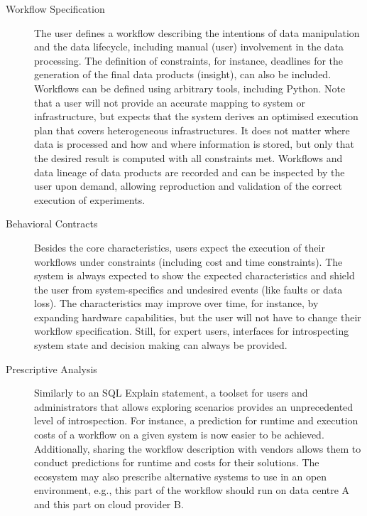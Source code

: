 \documentclass[a4paper]{article}
\begin{document}
{{\begin{description}
\item[Workflow Specification]

The user defines a workflow describing the intentions of data manipulation and the data lifecycle, including manual (user) involvement in the data processing.
The definition of constraints, for instance, deadlines for the generation of the final data products (insight), can also be included.
Workflows can be defined using arbitrary tools, including Python.
Note that a user will not provide an accurate mapping to system or infrastructure, but expects that the system derives an optimised execution plan that covers heterogeneous infrastructures.
It does not matter where data is processed and how and where information is stored, but only that the desired result is computed with all constraints met.
Workflows and data lineage of data products are recorded and can be inspected by the user upon demand, allowing reproduction and validation of the correct execution of experiments.

\item[Behavioral Contracts]

Besides the core characteristics, users expect the execution of their workflows under constraints (including cost and time constraints).
The system is always expected to show the expected characteristics and shield the user from system-specifics and undesired events (like faults or data loss).
The characteristics may improve over time, for instance, by expanding hardware capabilities, but the user will not have to change their workflow specification.
Still, for expert users, interfaces for introspecting system state and decision making can always be provided.

\item[Prescriptive Analysis]

Similarly to an SQL Explain statement, a toolset for users and administrators that allows exploring scenarios provides an unprecedented level of introspection. For instance, a prediction for runtime and execution costs of a workflow on a given system is now easier to be achieved.
Additionally, sharing the workflow description with vendors allows them to conduct predictions for runtime and costs for their solutions.
The ecosystem may also prescribe alternative systems to use in an open environment, e.g., this part of the workflow should run on data centre A and this part on cloud provider B.

\end{description}

}}
\end{document}
